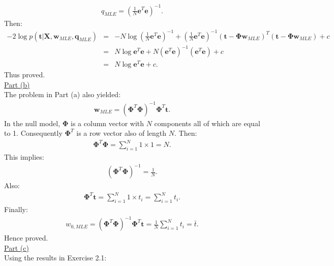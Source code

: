\documentclass[a4paper, 11pt]{article}
\begin{document}
\begin{eqnarray}
q_{MLE} = \left( \frac{1}{N} \mathbf{e}^T \mathbf{e} \right)^{-1}. \nonumber
\end{eqnarray}
Then:
\begin{eqnarray}
-2 \log p(\mathbf{t} | \mathbf{X}, \mathbf{w}_{MLE}, \mathbf{q}_{MLE}) &=& -N \log \left( \frac{1}{N} \mathbf{e}^T \mathbf{e} \right)^{-1} + \left( \frac{1}{N} \mathbf{e}^T \mathbf{e} \right)^{-1} (\mathbf{t} - \mathbf{\Phi} \mathbf{w}_{MLE})^T (\mathbf{t} - \mathbf{\Phi} \mathbf{w}_{MLE}) + c \nonumber \\
&=& N \log \mathbf{e}^T \mathbf{e} + N \left( \mathbf{e}^T \mathbf{e} \right)^{-1} \left( \mathbf{e}^T \mathbf{e} \right) + c \nonumber \\
&=& N \log \mathbf{e}^T \mathbf{e} + c. \nonumber
\end{eqnarray}
Thus proved.\\
\newline \underline{Part (b)}\\
\newline The problem in Part (a) also yielded:
\begin{eqnarray}
\mathbf{w}_{MLE} = \left( \mathbf{\Phi}^T \mathbf{\Phi} \right)^{-1} \mathbf{\Phi}^T \mathbf{t}. \nonumber
\end{eqnarray}
In the null model, $\mathbf{\Phi}$ is a column vector with $N$ components all of which are equal to 1. Consequently $\mathbf{\Phi}^T$ is a row vector also of length $N$. Then:
\begin{eqnarray}
\mathbf{\Phi}^T \mathbf{\Phi} = \sum_{i=1}^{N} 1 \times 1 = N. \nonumber
\end{eqnarray}
This implies:
\begin{eqnarray}
\left( \mathbf{\Phi}^T \mathbf{\Phi} \right)^{-1} = \frac{1}{N}. \nonumber
\end{eqnarray}
Also:
\begin{eqnarray}
\mathbf{\Phi}^T \mathbf{t} = \sum_{i=1}^{N} 1 \times t_i = \sum_{i=1}^{N} t_i. \nonumber
\end{eqnarray}
Finally:
\begin{eqnarray}
w_{0, MLE} = \left( \mathbf{\Phi}^T \mathbf{\Phi} \right)^{-1} \mathbf{\Phi}^T \mathbf{t} = \frac{1}{N} \sum_{i=1}^{N} t_i = \bar{t}. \nonumber
\end{eqnarray}
Hence proved.\\
\newline \underline{Part (c)}\\
\newline Using the results in Exercise 2.1:
\end{document}
